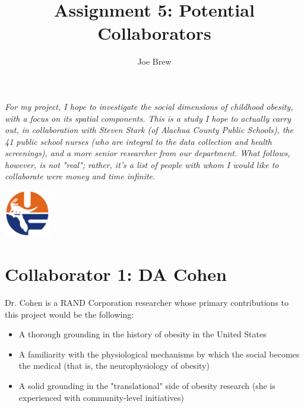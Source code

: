 \documentclass[11pt]{article}
\begin{document}


\title{\textbf{Assignment 5: Potential Collaborators}}
\author{Joe Brew}


\maketitle

\emph{
 For my project, I hope to investigate the social dimensions of childhood obesity, with a focus on its spatial components.  This is a study I hope to actually carry out, in collaboration with Steven Stark (of Alachua County Public Schools), the 41 public school nurses (who are integral to the data collection and health screenings), and a more senior researcher from our department.  What follows, however, is not "real"; rather, it's a list of people with whom I would like to collaborate were money and time infinite.
}
\tableofcontents

\vspace{20mm}

\begin{center}
\includegraphics[width=2cm]{uf}
\end{center}



\hrulefill


\section*{Collaborator 1: DA Cohen}

Dr. Cohen is a RAND Corporation researcher whose primary contributions to this project would be the following:
\begin{itemize}
\item A thorough grounding in the history of obesity in the United States\cite{Cohen2008}
\item A familiarity with the physiological mechanisms by which the social becomes the medical (that is, the neurophysiology of obesity)\cite{Cohen2008b}
\item A solid grounding in the "translational" side of obesity research (she is experienced with community-level initiatives)\cite{Derose2014}
\end{itemize}
\end{document}

